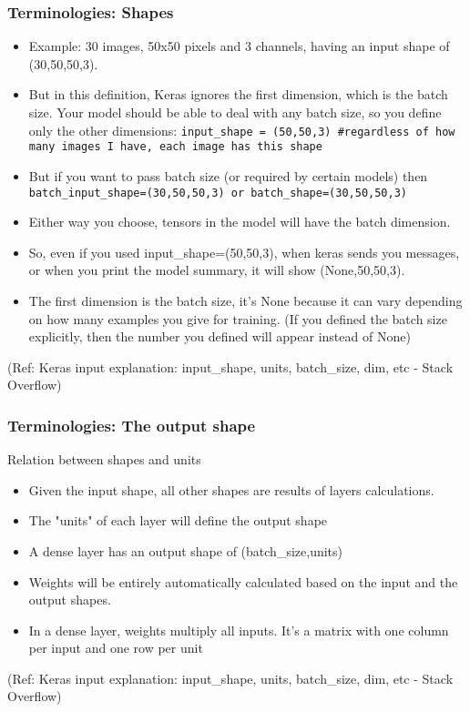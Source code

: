 \begin{frame}[fragile] \frametitle{Terminologies: Shapes}

\begin{itemize}
\item Example: 30 images, 50x50 pixels and 3 channels, having an input shape of (30,50,50,3).
\item But in this definition, Keras ignores the first dimension, which is the batch size. Your model should be able to deal with any batch size, so you define only the other dimensions: \lstinline|input_shape = (50,50,3) #regardless of how many images I have, each image has this shape|
\item But if you want to pass batch size (or required by certain models)  then \lstinline|batch_input_shape=(30,50,50,3) or batch_shape=(30,50,50,3)|
\item Either way you choose, tensors in the model will have the batch dimension.
\item So, even if you used input\_shape=(50,50,3), when keras sends you messages, or when you print the model summary, it will show (None,50,50,3).
\item The first dimension is the batch size, it's None because it can vary depending on how many examples you give for training. (If you defined the batch size explicitly, then the number you defined will appear instead of None)
\end{itemize}

\tiny{(Ref: Keras input explanation: input\_shape, units, batch\_size, dim, etc - Stack Overflow)}
\end{frame}


\begin{frame}[fragile] \frametitle{Terminologies: The output shape}

Relation between shapes and units

\begin{itemize}
\item Given the input shape, all other shapes are results of layers calculations.
\item The "units" of each layer will define the output shape
\item A dense layer has an output shape of (batch\_size,units)
\item Weights will be entirely automatically calculated based on the input and the output shapes.
\item In a dense layer, weights multiply all inputs. It's a matrix with one column per input and one row per unit
\end{itemize}

\tiny{(Ref: Keras input explanation: input\_shape, units, batch\_size, dim, etc - Stack Overflow)}
\end{frame}


